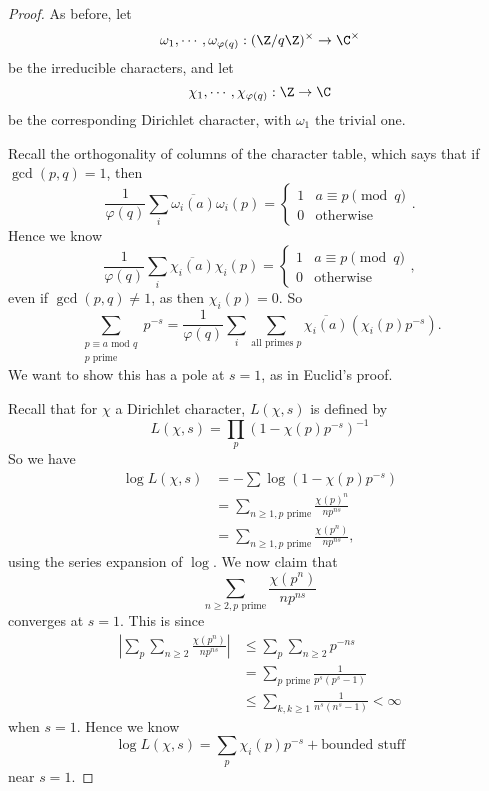 \documentclass[a4paper]{article}
\begin{document}
\begin{proof}
  As before, let
  \[
    \omega_1, \cdots, \omega_{\varphi(q)}: (\Z/q\Z)^\times \to \C^\times
  \]
  be the irreducible characters, and let
  \[
    \chi_1, \cdots, \chi_{\varphi(q)}: \Z \to \C
  \]
  be the corresponding Dirichlet character, with $\omega_1$ the trivial one.

  Recall the orthogonality of columns of the character table, which says that if $\gcd(p, q) = 1$, then
  \[
    \frac{1}{\varphi(q)} \sum_i \overline{\omega_i(a)} \omega_i(p) =
    \begin{cases}
      1 & a \equiv p \pmod q\\
      0 & \text{otherwise}
    \end{cases}.
  \]
  Hence we know
  \[
    \frac{1}{\varphi(q)} \sum_i \overline{\chi_i(a)} \chi_i(p) =
    \begin{cases}
      1 & a \equiv p \pmod q\\
      0 & \text{otherwise}
    \end{cases},
  \]
  even if $\gcd(p, q) \not= 1$, as then $\chi_i(p) = 0$. So
  \[
    \sum_{\substack{p \equiv a \text{ mod } q\\ p \text{ prime}}} p^{-s} = \frac{1}{\varphi(q)} \sum_i \sum_{\text{all primes } p} \overline{\chi_i(a)} (\chi_i(p) p^{-s}).\tag{$\ddagger$}
  \]
  We want to show this has a pole at $s = 1$, as in Euclid's proof.

  Recall that for $\chi$ a Dirichlet character, $L(\chi, s)$ is defined by
  \[
    L(\chi, s) = \prod_p (1 - \chi(p) p^{-s})^{-1}
  \]
  So we have
  \begin{align*}
    \log L(\chi, s) &= -\sum \log (1 - \chi(p) p^{-s})\\
    &= \sum_{n \geq 1, p\text{ prime}} \frac{\chi(p)^n}{n p^{ns}}\\
    &= \sum_{n \geq 1, p\text{ prime}} \frac{\chi(p^n)}{np^{ns}},
  \end{align*}
  using the series expansion of $\log$. We now claim that
  \[
    \sum_{n \geq 2, p\text{ prime}} \frac{\chi(p^n)}{np^{ns}}
  \]
  converges at $s = 1$. This is since
  \begin{align*}
    \left|\sum_p\sum_{n\geq 2} \frac{\chi(p^n)}{np^{ns}}\right| &\leq \sum_p \sum_{n \geq 2} p^{-ns} \\
    &= \sum_{p\text{ prime}} \frac{1}{p^s(p^s - 1)}\\
    &\leq \sum_{k, k \geq 1} \frac{1}{n^s(n^s - 1)} < \infty
  \end{align*}
  when $s = 1$. Hence we know
  \[
    \log L(\chi, s) = \sum_p \chi_i(p) p^{-s} + \text{bounded stuff}
  \]
  near $s = 1$.


\end{proof}
\end{document}
